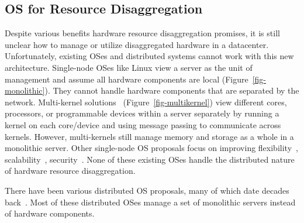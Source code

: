\documentclass[10pt,times,twocolumn]{z2-article}
\begin{document}
\subsection{OS for Resource Disaggregation}

Despite various benefits hardware resource disaggregation promises, 
it is still unclear how to manage or utilize disaggregated hardware in a datacenter.
Unfortunately, existing OSes and distributed systems cannot work with this new architecture.
Single-node OSes like Linux view a server as the unit of management and assume all hardware components are local (Figure~\ref{fig-monolithic}).
They cannot handle hardware components that are separated by the network.
Multi-kernel solutions~\cite{Baumann-SOSP09,Barrelfish-DC,Helios-SOSP,fos-SOCC,Hive-SOSP} (Figure~\ref{fig-multikernel}) 
view different cores, processors, or programmable devices within a server separately 
by running a kernel on each core/device and using message passing to communicate across kernels.
However, multi-kernels still manage memory and storage as a whole in a monolithic server.
Other single-node OS proposals focus on improving flexibility~\cite{Exokernel,Drawbridge}, scalability~\cite{Corey-OSDI,Disco,K42-EUROSYS}, security~\cite{SealingOS}.
None of these existing OSes handle the distributed nature of hardware resource disaggregation.

There have been various distributed OS proposals,
many of which date decades back~\cite{Amoeba-Experience,Sprite,MOSIX,V-System,Accent-SOSP,DEMOS-SOSP,Charlotte}.
Most of these distributed OSes manage a set of monolithic servers
instead of hardware components.
\end{document}
